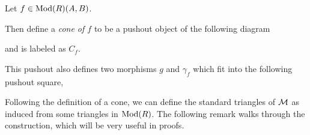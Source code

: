 \begin{definition}
    \label{def:stmod_cone}
    Let \( f \in \operatorname{Mod}(R)(A, B) \).
    
    Then define a \emph{cone of \( f \)} to be a pushout object of the following diagram
    \begin{center}
    \end{center}
    and is labeled as \( C_f \).

    This pushout also defines two morphisms \( g \) and \( \gamma_f \) which fit into the following pushout square,
    \begin{center}
    \end{center}
\end{definition}

Following the definition of a cone, we can define the standard triangles of \( {\mathcal{M}} \) as induced from some triangles in \( \operatorname{Mod}(R) \). The following remark walks through the construction, which will be very useful in proofs.

